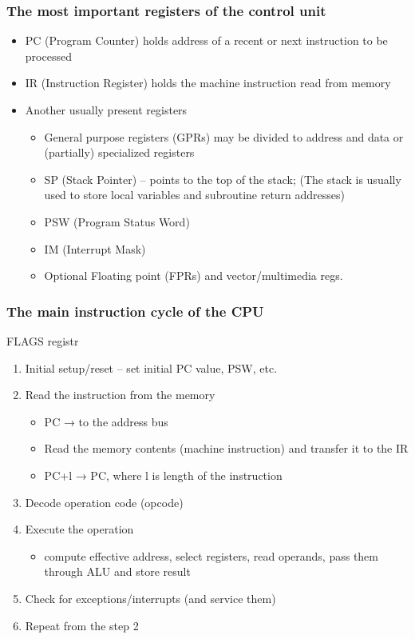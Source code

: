 \documentclass{beamer}
\begin{document}
\begin{frame}
\frametitle{The most important registers of the control unit}
\begin{itemize}
\item PC (Program Counter)
holds address of a recent or next instruction to be processed
\item IR (Instruction Register)
holds the machine instruction read from memory
\item Another usually present registers
\begin{itemize}
\item General purpose registers (GPRs)
may be divided to address and data or (partially) specialized registers
\item SP (Stack Pointer) – points to the top of the stack; (The stack is usually used to store local variables and subroutine return addresses)
\item PSW (Program Status Word)
\item IM (Interrupt Mask)
\item Optional Floating point (FPRs) and vector/multimedia regs.
\end{itemize}
\end{itemize}
\end{frame}

\begin{frame}
\frametitle{The main instruction cycle of the CPU}
FLAGS registr 
\begin{enumerate}
  \item Initial setup/reset – set initial PC value, PSW, etc.
  \item Read the instruction from the memory
  \begin{itemize}
    \item PC → to the address bus
    \item Read the memory contents (machine instruction) and transfer it to the IR
    \item PC+l → PC, where l is length of the instruction
  \end{itemize}
  \item Decode operation code (opcode)
  \item Execute the operation
  \begin{itemize}
    \item compute effective address, select registers, read operands, pass them  through ALU and store result
  \end{itemize}
  \item Check for exceptions/interrupts (and service them)
  \item Repeat from the step 2
\end{enumerate}
\end{frame}
\end{document}
